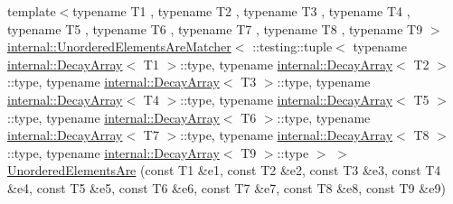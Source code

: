 \begin{DoxyCompactItemize}
\item 
{\footnotesize template$<$typename T1 , typename T2 , typename T3 , typename T4 , typename T5 , typename T6 , typename T7 , typename T8 , typename T9 $>$ }\\\hyperlink{classtesting_1_1internal_1_1_unordered_elements_are_matcher}{internal\+::\+Unordered\+Elements\+Are\+Matcher}$<$ \+::testing\+::tuple$<$ typename \hyperlink{structtesting_1_1internal_1_1_decay_array}{internal\+::\+Decay\+Array}$<$ T1 $>$\+::type, typename \hyperlink{structtesting_1_1internal_1_1_decay_array}{internal\+::\+Decay\+Array}$<$ T2 $>$\+::type, typename \hyperlink{structtesting_1_1internal_1_1_decay_array}{internal\+::\+Decay\+Array}$<$ T3 $>$\+::type, typename \hyperlink{structtesting_1_1internal_1_1_decay_array}{internal\+::\+Decay\+Array}$<$ T4 $>$\+::type, typename \hyperlink{structtesting_1_1internal_1_1_decay_array}{internal\+::\+Decay\+Array}$<$ T5 $>$\+::type, typename \hyperlink{structtesting_1_1internal_1_1_decay_array}{internal\+::\+Decay\+Array}$<$ T6 $>$\+::type, typename \hyperlink{structtesting_1_1internal_1_1_decay_array}{internal\+::\+Decay\+Array}$<$ T7 $>$\+::type, typename \hyperlink{structtesting_1_1internal_1_1_decay_array}{internal\+::\+Decay\+Array}$<$ T8 $>$\+::type, typename \hyperlink{structtesting_1_1internal_1_1_decay_array}{internal\+::\+Decay\+Array}$<$ T9 $>$\+::type $>$ $>$ \hyperlink{namespacetesting_a2e03e363e193ef512bf9fa964c484375}{Unordered\+Elements\+Are} (const T1 \&e1, const T2 \&e2, const T3 \&e3, const T4 \&e4, const T5 \&e5, const T6 \&e6, const T7 \&e7, const T8 \&e8, const T9 \&e9)
\item 

\end{DoxyCompactItemize}
